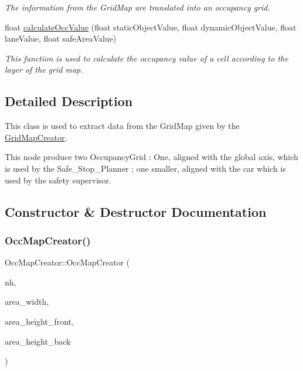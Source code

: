 \begin{DoxyCompactItemize}
\begin{DoxyCompactList}\small\item\em The information from the Grid\+Map are translated into an occupancy grid. \end{DoxyCompactList}\item 
float \hyperlink{classOccMapCreator_a1efcaad9fdb9feca05c7013e99912f66}{calculate\+Occ\+Value} (float static\+Object\+Value, float dynamic\+Object\+Value, float lane\+Value, float safe\+Area\+Value)
\begin{DoxyCompactList}\small\item\em This function is used to calculate the occupancy value of a cell according to the layer of the grid map. \end{DoxyCompactList}\end{DoxyCompactItemize}


\subsection{Detailed Description}
This class is used to extract data from the Grid\+Map given by the \hyperlink{classGridMapCreator}{Grid\+Map\+Creator}. 

This node produce two Occupancy\+Grid \+: One, aligned with the global axis, which is used by the Safe\+\_\+\+Stop\+\_\+\+Planner ; one smaller, aligned with the car which is used by the safety supervisor. 

\subsection{Constructor \& Destructor Documentation}
\mbox{\label{classOccMapCreator_a067844320d21de45f00cb997480a6088}} 
\subsubsection{\texorpdfstring{Occ\+Map\+Creator()}{OccMapCreator()}}
{\footnotesize\ttfamily Occ\+Map\+Creator\+::\+Occ\+Map\+Creator (\begin{DoxyParamCaption}\item[{ros\+::\+Node\+Handle \&}]{nh,  }\item[{const float}]{area\+\_\+width,  }\item[{const float}]{area\+\_\+height\+\_\+front,  }\item[{const float}]{area\+\_\+height\+\_\+back }\end{DoxyParamCaption})\hspace{0.3cm}{\ttfamily [inline]}}



